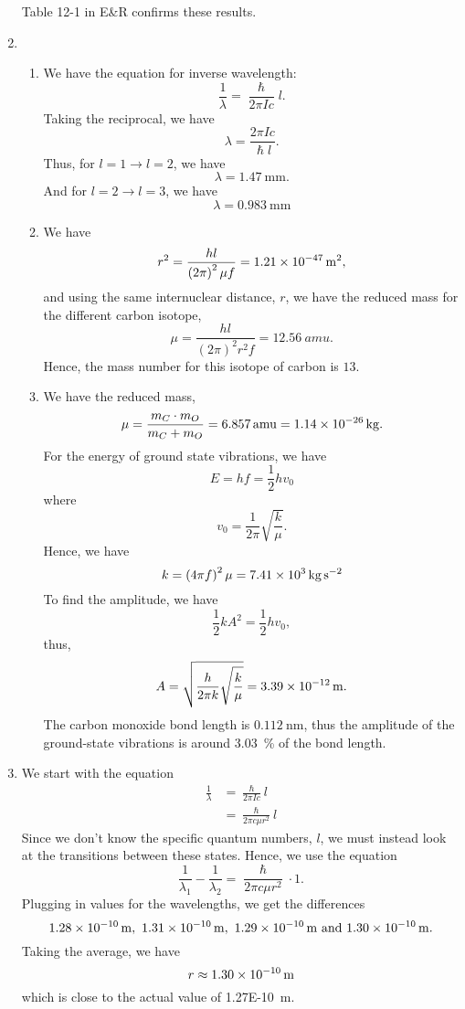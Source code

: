 \documentclass[10pt]{article}
\begin{document}
\begin{enumerate}
  Table 12-1 in E\&R confirms these results.
\item 
  \begin{enumerate}
  \item 
    We have the equation for inverse wavelength:
    \[
      \frac{1}{\lambda} = \frac{\hslash}{2\pi I c} l
    .\]
    Taking the reciprocal, we have
    \[
      \lambda = \frac{2\pi I c}{\hslash l}
    .\]
    Thus, for $ l=1 \to l = 2 $, we have 
    \[
      \lambda =\qty{1.47}{\milli\meter}
    .\]
    And for $ l=2 \to l = 3 $, we have 
    \[
      \lambda =\qty{0.983}{\milli\meter}
    \]
  \item 
    We have 
    \[
      r ^2 = \frac{h l}{\left( 2\pi \right)^2 \mu f} = \qty{1.21 E -47}{m ^2}
    ,\]
    and using the same internuclear distance, $ r $, we have the reduced mass for the different carbon isotope, 
    \[
      \mu = \frac{hl}{\left( 2\pi \right)^2 r ^2 f} = \qty{12.56}{amu}
    .\]
    Hence, the mass number for this isotope of carbon is $ 13 $.
  \item 
    We have the reduced mass, 
    \[
      \mu = \frac{m_C \cdot m_O}{m_C + m_O} = \qty{6.857}{amu} = \qty{1.14E -26}{\kg}
    .\]
    For the energy of ground state vibrations, we have 
    \[
      E = hf = \frac{1}{2} h v_0
    \]
    where
    \[
    v_0 = \frac{1}{2\pi} \sqrt{\frac{k}{\mu}}
    .\]
    Hence, we have 
    \[
      k = \left( 4 \pi f \right) ^2 \mu = \qty{7.41E3}{\kilogram\per\square\second}
    \]
    To find the amplitude, we have 
    \[
      \frac{1}{2} k A^2 = \frac{1}{2} h v_0
    ,\]
    thus, 
    \[
      A =  \sqrt{\frac{h}{2\pi k} \sqrt{\frac{k}{\mu}}} = \qty{3.39E-12}{\meter}
    .\]
    The carbon monoxide bond length is $ \qty{0.112}{\nano\meter} $, thus the amplitude of the ground-state vibrations is around \qty{3.03}{\percent} of the bond length.
  \end{enumerate}
\item 
  We start with the equation 
  \begin{align*}
    \frac{1}{\lambda} &= \frac{\hslash}{2\pi I c} l \\
     &= \frac{\hslash}{2 \pi c \mu r ^2} l
  \end{align*}
  Since we don't know the specific quantum numbers, $ l $, we must instead look at the transitions between these states. Hence, we use the equation 
  \[
    \frac{1}{\lambda_1} - \frac{1}{\lambda_2} = \frac{\hslash}{2 \pi c \mu r ^2} \cdot 1
  .\]
  Plugging in values for the wavelengths, we get the differences 
  \[
    \qtylist{1.28E-10;1.31E-10;1.29E-10;1.30E-10}{\meter}
  .\]
  Taking the average, we have 
  \[
    r \approx\qty{1.30E-10}{\meter}
  \]
  which is close to the actual value of \qty{1.27E-10}{\meter}.
\end{enumerate}
\end{document}
